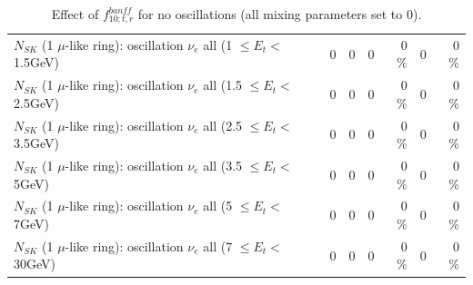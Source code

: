 \begin{table}
\begin{tabular}{| l | r | r | r  r | r  r |}
$N_{SK}$ (1 $\mu$-like ring): oscillation $\nu_{e}$ all (1 $\leq E_{t} <$ 1.5GeV) &               0 &               0 &               0 &        0 \%  &               0 &        0 \%  \\ 
$N_{SK}$ (1 $\mu$-like ring): oscillation $\nu_{e}$ all (1.5 $\leq E_{t} <$ 2.5GeV) &               0 &               0 &               0 &        0 \%  &               0 &        0 \%  \\ 
$N_{SK}$ (1 $\mu$-like ring): oscillation $\nu_{e}$ all (2.5 $\leq E_{t} <$ 3.5GeV) &               0 &               0 &               0 &        0 \%  &               0 &        0 \%  \\ 
$N_{SK}$ (1 $\mu$-like ring): oscillation $\nu_{e}$ all (3.5 $\leq E_{t} <$ 5GeV) &               0 &               0 &               0 &        0 \%  &               0 &        0 \%  \\ 
 $N_{SK}$ (1 $\mu$-like ring): oscillation $\nu_{e}$ all (5 $\leq E_{t} <$ 7GeV) &               0 &               0 &               0 &        0 \%  &               0 &        0 \%  \\ 
$N_{SK}$ (1 $\mu$-like ring): oscillation $\nu_{e}$ all (7 $\leq E_{t} <$ 30GeV) &               0 &               0 &               0 &        0 \%  &               0 &        0 \%  \\ 
\hline
\hline
\end{tabular}
\caption{ Effect of $f_{10; t, r}^{banff}$ for no oscillations (all mixing parameters set to 0). }
\label{tab:num_banff_10_1RmuT_3f_osc_t13:0}
\end{table}
\clearpage
